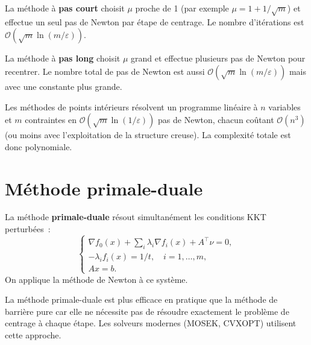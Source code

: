 \begin{definition}
La m\'ethode \`a \textbf{pas court} choisit $\mu$ proche de 1
(par exemple $\mu = 1 + 1/\sqrt{m}$) et effectue un seul pas de Newton
par \'etape de centrage. Le nombre d'it\'erations est
$\mathcal{O}(\sqrt{m} \ln(m/\varepsilon))$.
\end{definition}

\begin{definition}
La m\'ethode \`a \textbf{pas long} choisit $\mu$ grand et effectue
plusieurs pas de Newton pour recentrer. Le nombre total de pas de Newton est
aussi $\mathcal{O}(\sqrt{m} \ln(m/\varepsilon))$ mais avec une constante
plus grande.
\end{definition}

\begin{theoreme}
Les m\'ethodes de points int\'erieurs r\'esolvent un programme lin\'eaire
\`a $n$ variables et $m$ contraintes en $\mathcal{O}(\sqrt{m} \ln(1/\varepsilon))$
pas de Newton, chacun co\^utant $\mathcal{O}(n^3)$ (ou moins avec
l'exploitation de la structure creuse). La complexit\'e totale est donc
polynomiale.
\end{theoreme}

\section{M\'ethode primale-duale}

\begin{definition}
La m\'ethode \textbf{primale-duale} r\'esout simultan\'ement les conditions
KKT perturb\'ees~:
\[
  \begin{cases}
    \nabla f_0(x) + \sum_i \lambda_i \nabla f_i(x) + A^\top \nu = 0, \\
    -\lambda_i f_i(x) = 1/t, \quad i = 1, \ldots, m, \\
    Ax = b.
  \end{cases}
\]
On applique la m\'ethode de Newton \`a ce syst\`eme.
\end{definition}

\begin{remarque}
La m\'ethode primale-duale est plus efficace en pratique que la m\'ethode de
barri\`ere pure car elle ne n\'ecessite pas de r\'esoudre exactement le
probl\`eme de centrage \`a chaque \'etape. Les solveurs modernes (MOSEK,
CVXOPT) utilisent cette approche.
\end{remarque}

